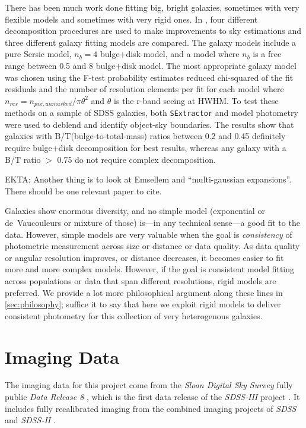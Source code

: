 \documentclass[12pt,preprint,pdftex]{aastex}
\newcommand{\project}[1]{\textsl{#1}}
\begin{document}
There has been much work done fitting big, bright galaxies, sometimes
with very flexible models and sometimes with very rigid ones. In
\cite{simard11}, four different decomposition procedures are used to
make improvements to sky estimations and three different galaxy
fitting models are compared. The galaxy models include a pure Sersic
model, $n_b=4$ bulge$+$disk model, and a model where $n_b$ is a free
range between 0.5 and 8 bulge$+$disk model. The most appropriate
galaxy model was chosen using the F-test probability estimates reduced
chi-squared of the fit residuals and the number of resolution elements
per fit for each model where $n_{res}=n_{pix,unmasked}/ \pi\theta^2$
and $\theta$ is the r-band seeing at HWHM. To test these methods on a
sample of SDSS galaxies, both \verb|SExtractor| and model photometry
were used to deblend and identify object-sky boundaries. The results
show that galaxies with B/T(bulge-to-total-mass) ratios between 0.2
and 0.45 definitely require bulge$+$disk decomposition for best
results, whereas any galaxy with a B/T ratio $>$ 0.75 do not require
complex decomposition.

EKTA: Another thing is to look at Emsellem and ``multi-gaussian
expansions''.  There should be one relevant paper to cite.

Galaxies show enormous diversity, and no simple model (exponential or
de~Vaucouleurs or mixture of those) is---in any technical sense---a
good fit to the data.  However, simple models are very valuable when
the goal is \emph{consistency} of photometric measurement across size
or distance or data quality.  As data quality or angular resolution
improves, or distance decreases, it becomes easier to fit more and
more complex models.  However, if the goal is consistent model fitting
across populations or data that span different resolutions, rigid
models are preferred.  We provide a lot more philosophical argument
along these lines in \ref{sec:philosophy}; suffice it to say that here we
exploit rigid models to deliver consistent photometry for this
collection of very heterogenous galaxies.

\section{Imaging Data}\label{sec:data}
The imaging data for this project come from the \project{Sloan Digital
  Sky Survey} fully public \project{Data Release 8} \citep{dr8}, which is
the first data release of the \project{SDSS-III} project \citep{sdssiii}.  It
includes fully recalibrated imaging \citep{padmanabhan} from the
combined imaging projects of \project{SDSS} \citep{york}  and
\project{SDSS-II} \citep{sdssii}.
\end{document}
